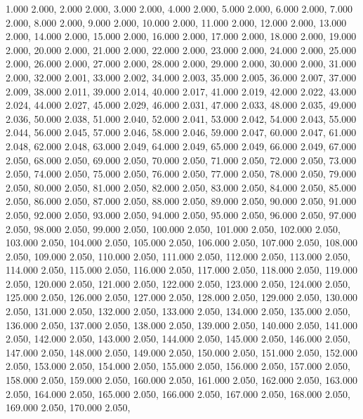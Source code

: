1.000 2.000, 
2.000 2.000, 
3.000 2.000, 
4.000 2.000, 
5.000 2.000, 
6.000 2.000, 
7.000 2.000, 
8.000 2.000, 
9.000 2.000, 
10.000 2.000, 
11.000 2.000, 
12.000 2.000, 
13.000 2.000, 
14.000 2.000, 
15.000 2.000, 
16.000 2.000, 
17.000 2.000, 
18.000 2.000, 
19.000 2.000, 
20.000 2.000, 
21.000 2.000, 
22.000 2.000, 
23.000 2.000, 
24.000 2.000, 
25.000 2.000, 
26.000 2.000, 
27.000 2.000, 
28.000 2.000, 
29.000 2.000, 
30.000 2.000, 
31.000 2.000, 
32.000 2.001, 
33.000 2.002, 
34.000 2.003, 
35.000 2.005, 
36.000 2.007, 
37.000 2.009, 
38.000 2.011, 
39.000 2.014, 
40.000 2.017, 
41.000 2.019, 
42.000 2.022, 
43.000 2.024, 
44.000 2.027, 
45.000 2.029, 
46.000 2.031, 
47.000 2.033, 
48.000 2.035, 
49.000 2.036, 
50.000 2.038, 
51.000 2.040, 
52.000 2.041, 
53.000 2.042, 
54.000 2.043, 
55.000 2.044, 
56.000 2.045, 
57.000 2.046, 
58.000 2.046, 
59.000 2.047, 
60.000 2.047, 
61.000 2.048, 
62.000 2.048, 
63.000 2.049, 
64.000 2.049, 
65.000 2.049, 
66.000 2.049, 
67.000 2.050, 
68.000 2.050, 
69.000 2.050, 
70.000 2.050, 
71.000 2.050, 
72.000 2.050, 
73.000 2.050, 
74.000 2.050, 
75.000 2.050, 
76.000 2.050, 
77.000 2.050, 
78.000 2.050, 
79.000 2.050, 
80.000 2.050, 
81.000 2.050, 
82.000 2.050, 
83.000 2.050, 
84.000 2.050, 
85.000 2.050, 
86.000 2.050, 
87.000 2.050, 
88.000 2.050, 
89.000 2.050, 
90.000 2.050, 
91.000 2.050, 
92.000 2.050, 
93.000 2.050, 
94.000 2.050, 
95.000 2.050, 
96.000 2.050, 
97.000 2.050, 
98.000 2.050, 
99.000 2.050, 
100.000 2.050, 
101.000 2.050, 
102.000 2.050, 
103.000 2.050, 
104.000 2.050, 
105.000 2.050, 
106.000 2.050, 
107.000 2.050, 
108.000 2.050, 
109.000 2.050, 
110.000 2.050, 
111.000 2.050, 
112.000 2.050, 
113.000 2.050, 
114.000 2.050, 
115.000 2.050, 
116.000 2.050, 
117.000 2.050, 
118.000 2.050, 
119.000 2.050, 
120.000 2.050, 
121.000 2.050, 
122.000 2.050, 
123.000 2.050, 
124.000 2.050, 
125.000 2.050, 
126.000 2.050, 
127.000 2.050, 
128.000 2.050, 
129.000 2.050, 
130.000 2.050, 
131.000 2.050, 
132.000 2.050, 
133.000 2.050, 
134.000 2.050, 
135.000 2.050, 
136.000 2.050, 
137.000 2.050, 
138.000 2.050, 
139.000 2.050, 
140.000 2.050, 
141.000 2.050, 
142.000 2.050, 
143.000 2.050, 
144.000 2.050, 
145.000 2.050, 
146.000 2.050, 
147.000 2.050, 
148.000 2.050, 
149.000 2.050, 
150.000 2.050, 
151.000 2.050, 
152.000 2.050, 
153.000 2.050, 
154.000 2.050, 
155.000 2.050, 
156.000 2.050, 
157.000 2.050, 
158.000 2.050, 
159.000 2.050, 
160.000 2.050, 
161.000 2.050, 
162.000 2.050, 
163.000 2.050, 
164.000 2.050, 
165.000 2.050, 
166.000 2.050, 
167.000 2.050, 
168.000 2.050, 
169.000 2.050, 
170.000 2.050, 
